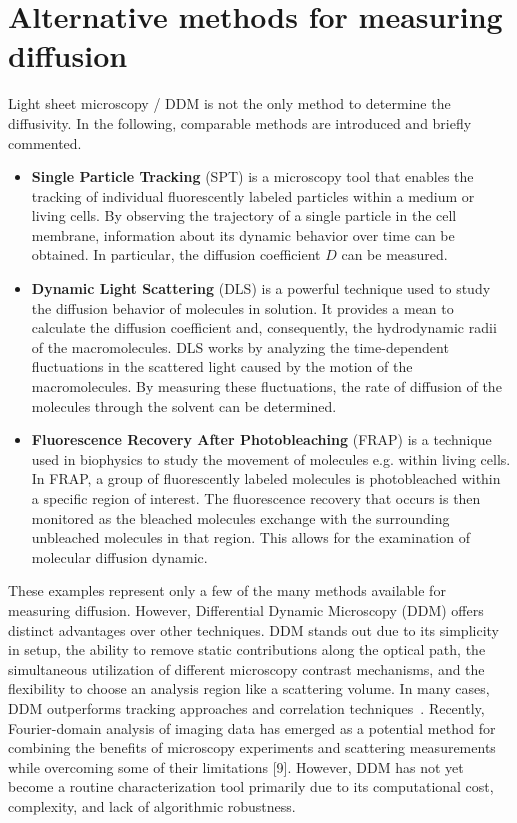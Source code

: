\section[Alternative methods]{Alternative methods for measuring diffusion}
\label{sec:AlternativeMethods}

Light sheet microscopy / DDM is not the only method to determine the diffusivity. In the following, comparable methods are introduced and briefly 
commented. 

\begin{itemize}
    \item \textbf{Single Particle Tracking} (SPT) is a microscopy tool that enables the tracking of individual fluorescently labeled particles 
    within a medium or living cells. By observing the trajectory of a single particle in the cell membrane, 
    information about its dynamic behavior over time can be obtained. In particular, the diffusion coefficient $D$ can 
    be measured.
    \item \textbf{Dynamic Light Scattering} (DLS) is a powerful technique used to study the diffusion
    behavior of molecules in solution. It provides a mean to calculate the diffusion
    coefficient and, consequently, the hydrodynamic radii of the macromolecules. DLS works 
    by analyzing the time-dependent fluctuations in the scattered light caused by the motion
    of the macromolecules. By measuring these fluctuations, the rate of diffusion of the
    molecules through the solvent can be determined.
    \item \textbf{Fluorescence Recovery After Photobleaching} (FRAP) is a technique used in biophysics to study the movement of molecules e.g. within living cells. In FRAP, a group of fluorescently labeled molecules is photobleached
    within a specific region of interest. The fluorescence recovery that occurs is then
    monitored as the bleached molecules exchange with the surrounding unbleached molecules in
    that region. This allows for the examination of molecular diffusion dynamic.
\end{itemize}
  
These examples represent only a few of the many methods available for measuring diffusion. However, Differential Dynamic Microscopy (DDM) offers distinct advantages over other techniques. DDM stands out due to its simplicity in setup, the ability to remove static contributions along the optical path, the simultaneous utilization of different microscopy contrast mechanisms, and the flexibility to choose an analysis region like a scattering volume. In many cases, DDM outperforms tracking approaches and correlation techniques~\cite{Berne.2013}. Recently, Fourier-domain analysis of imaging data has emerged as a potential method for combining the benefits of microscopy experiments and scattering measurements while overcoming some of their limitations [9]. However, DDM has not yet become a routine characterization tool primarily due to its computational cost, complexity, and lack of algorithmic robustness.